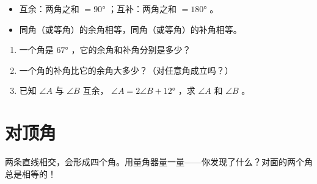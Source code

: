 \begin{keytakeaway}


\begin{itemize}
  \item 互余：两角之和 $= 90°$ ；互补：两角之和 $= 180°$ 。
  \item 同角（或等角）的余角相等，同角（或等角）的补角相等。
\end{itemize}


\end{keytakeaway}

\begin{practice}


\begin{enumerate}
  \item 一个角是 $67°$ ，它的余角和补角分别是多少？
  \item 一个角的补角比它的余角大多少？（对任意角成立吗？）
  \item 已知 $\angle A$ 与 $\angle B$ 互余， $\angle A = 2\angle B + 12°$ ，求 $\angle A$ 和 $\angle B$ 。
\end{enumerate}


\end{practice}



\section*{对顶角}


\begin{explore}


两条直线相交，会形成四个角。用量角器量一量——你发现了什么？对面的两个角总是相等的！

\end{explore}

